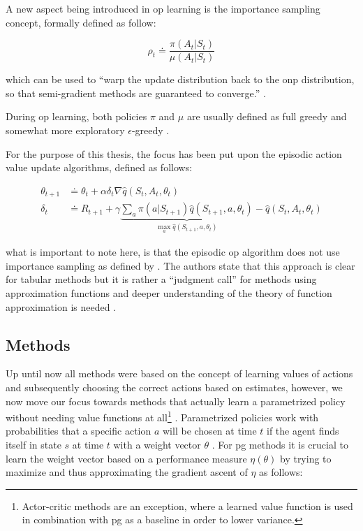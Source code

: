 \documentclass{seal_thesis}
\begin{document}
A new aspect being introduced in \gls{op} learning is the importance sampling concept, formally defined as follow:

\begin{equation}
\label{eq:importance_sampling}
	\rho_t \doteq \frac{\pi(A_t|S_t)}{\mu(A_t|S_t)}
\end{equation}

which can be used to ``warp the update distribution back to the \gls{onp} distribution, so that semi-gradient methods are guaranteed to converge.'' \cite[p. 243]{Sutton2017}.

During \gls{op} learning, both policies $\pi$ and $\mu$ are usually defined as full greedy and somewhat more exploratory $\epsilon$-greedy \cite[p. 243]{Sutton2017}.

For the purpose of this thesis, the focus has been put upon the episodic action value update algorithms, defined as follows:

\begin{align}
	\theta_{t+1} &\doteq \theta_t + \alpha \delta_t \nabla \hat{q} (S_t,A_t,\theta_t)\\
	\delta_t &\doteq R_{t+1} + \gamma \underbrace{\sum_a \pi (a|S_{t+1}) \hat{q} (S_{t+1},a,\theta_t)}_{\max_a \hat{q} (S_{t+1},a,\theta_t)} - \hat{q} (S_t,A_t,\theta_t)
\end{align}

what is important to note here, is that the episodic \gls{op} algorithm does not use importance sampling as defined by  \cite[p. 244]{Sutton2017}. The authors state that this approach is clear for tabular methods but it is rather a ``judgment call'' for methods using approximation functions and deeper understanding of the theory of function approximation is needed \cite[p. 244]{Sutton2017}.

\subsection{ Methods}
\label{subsec:polgrad_methods}

Up until now all methods were based on the concept of learning values of actions and subsequently choosing the correct actions based on estimates, however, we now move our focus towards methods that actually learn a parametrized policy without needing value functions at all\footnote{Actor-critic methods are an exception, where a learned value function is used in combination with \gls{pg} as a baseline in order to lower variance.}  \cite[p. 265]{Sutton2017}. Parametrized policies work with probabilities that a specific action $a$ will be chosen at time $t$ if the agent finds itself in state $s$ at time $t$ with a weight vector $\theta$ \cite[p. 265]{Sutton2017}. For \gls{pg} methods it is crucial to learn the weight vector based on a performance measure $\eta(\theta)$ by trying to maximize and thus approximating the gradient ascent of $\eta$ as follows:
\end{document}
